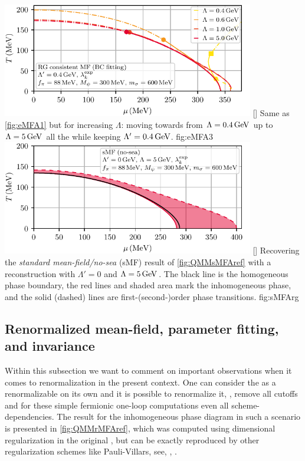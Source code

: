 \customWidthFigure%
	{%
	\includegraphics[width=11cm]{qmm/figures/eMFA_QMMCDW_PD_BC_04_all_88_300_600.pdf}
	}%
	[]
	{%
		Same as \cref{fig:eMFA1} but for increasing $\Lambda$: moving towards \rgcy{} from $\Lambda=0.4\,\mathrm{GeV}$ up to $\Lambda=5\,\mathrm{GeV}$ all the while keeping $\Lambda'=0.4\,\mathrm{GeV}$.
	}%
	{fig:eMFA3}
\customWidthFigure%
	{%
	\includegraphics[width=11cm]{qmm/figures/sMFA_QMMCDW_PD_BC_0_5_88_300_600.pdf}
	}%
	[]
	{%
		Recovering the \textit{standard mean-field/no-sea} (sMF) result of \cref{fig:QMMsMFAref} with a \rgct{} reconstruction with $\Lambda'=0$ and $\Lambda=5\,\mathrm{GeV}$.
		The black line is the homogeneous phase boundary, the red lines and shaded area mark the inhomogeneous phase, and the solid (dashed) lines are first-(second-)order phase transitions.
	}%
	{fig:sMFArg}
\FloatBarrier
\subsection{Renormalized mean-field, parameter fitting, and \Poincare{} invariance}\label{subsec:renomMF}
Within this subsection we want to comment on important observations when it comes to renormalization in the present \mf{} context. One can consider the \qmm{} as a renormalizable \qft{} on its own and it is possible to renormalize it, \ie{}, remove all cutoffs and for these simple fermionic one-loop computations even all scheme-dependencies. The result for the inhomogeneous phase diagram in such a scenario is presented in \cref{fig:QMMrMFAref}, which was computed using dimensional regularization in the original , but can be exactly reproduced by other regularization schemes like Pauli-Villars, see, \eg{}, .


